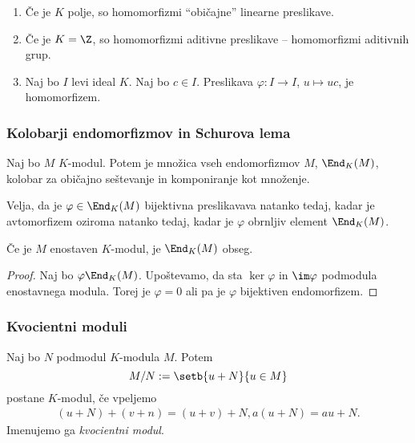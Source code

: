 \begin{primer}
    \begin{enumerate}
        \item Če je $K$ polje, so homomorfizmi ``običajne'' linearne preslikave.
        \item Če je $K = \Z$, so homomorfizmi aditivne preslikave -- homomorfizmi
        aditivnih grup.
        \item Naj bo $I$ levi ideal $K$. Naj bo $c \in I$. Preslikava $\varphi \colon I \to I$, 
        $u \mapsto uc$, je homomorfizem.
    \end{enumerate}
\end{primer}

\subsubsection*{Kolobarji endomorfizmov in Schurova lema}

Naj bo $M$ $K$-modul. Potem je množica vseh endomorfizmov $M$, $\End_K(M)$, kolobar
za običajno seštevanje in komponiranje kot množenje.

Velja, da je $\varphi \in \End_K(M)$ bijektivna preslikavava natanko tedaj, kadar je avtomorfizem oziroma 
natanko tedaj, kadar je $\varphi$ obrnljiv element $\End_K(M)$.

\begin{lema}[Schur]
    Če je $M$ enostaven $K$-modul, je $\End_K(M)$ obseg.
\end{lema}

\begin{proof}
    Naj bo $\varphi \End_K(M)$. Upoštevamo, da sta $\ker \varphi$ in $\im \varphi$ podmodula 
    enostavnega modula. Torej je $\varphi = 0$ ali pa je $\varphi$ bijektiven endomorfizem.
\end{proof}

\subsubsection*{Kvocientni moduli}

\begin{definicija}
    Naj bo $N$ podmodul $K$-modula $M$. Potem 
    \[
        M/N := \setb{u+N}{u \in M}
    \]
    postane $K$-modul, če vpeljemo
    \begin{align*}
        (u+N) + (v+n) = (u+v) + N, 
        a(u + N) = au + N.
    \end{align*}
    Imenujemo ga \emph{kvocientni modul}.
\end{definicija}

